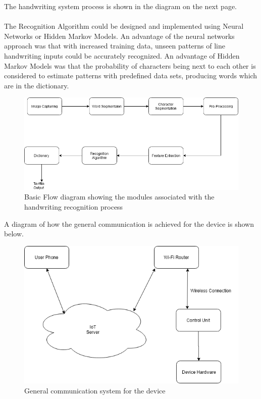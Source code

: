 The handwriting system process is shown in the diagram on the next page.\\\\
The Recognition Algorithm could be designed and implemented using Neural Networks or Hidden Markov Models. An advantage of the neural networks approach was that with increased training data, unseen patterns of line handwriting inputs could be accurately recognized. An advantage of Hidden Markov Models was that the probability of characters being next to each other is considered to estimate patterns with predefined data sets, producing words which are in the dictionary.
\newpage
\begin{figure}[h]
	\centering
	\includegraphics[scale=0.5]{2}
	\caption{Basic Flow diagram showing the modules associated with the handwriting recognition process}
\end{figure}
A diagram of how the general communication is achieved for the device is shown below.
\begin{figure}[h]
	\centering
	\includegraphics[scale=0.5]{3}
	\caption{General communication system for the device}
\end{figure}

